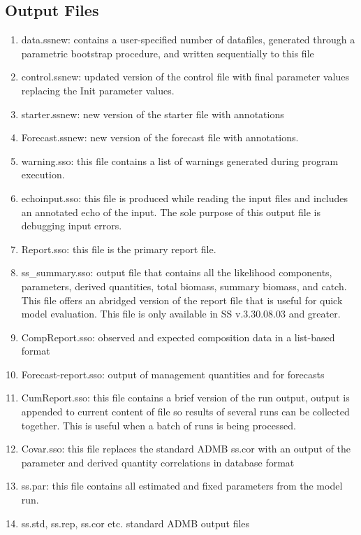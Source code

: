 	\subsection{Output Files}
	\begin{enumerate}
		\item data.ss\textunderscore new:  contains a user-specified number of datafiles, generated through a parametric bootstrap procedure, and written sequentially to this file
		\item control.ss\textunderscore new:  updated version of the control file with final parameter values replacing the Init parameter values.
		\item starter.ss\textunderscore new:  new version of the starter file with annotations
		\item Forecast.ss\textunderscore new:  new version of the forecast file with annotations.
		\item warning.sso:  this file contains a list of warnings generated during program execution.
		\item echoinput.sso:  this file is produced while reading the input files and includes an annotated echo of the input.  The sole purpose of this output file is debugging input errors.
		\item Report.sso:  this file is the primary report file.
		\item ss\_summary.sso: output file that contains all the likelihood components, parameters, derived quantities, total biomass, summary biomass, and catch. This file offers an abridged version of the report file that is useful for quick model evaluation. This file is only available in SS v.3.30.08.03 and greater.
		\item CompReport.sso:  observed and expected composition data in a list-based format
		\item Forecast-report.sso:  output of management quantities and for forecasts
		\item CumReport.sso:  this file contains a brief version of the run output, output is appended to current content of file so results of several runs can be collected together.  This is useful when a batch of runs is being processed.
		\item Covar.sso:  this file replaces the standard ADMB ss.cor with an output of the parameter and derived quantity correlations in database format
		\item ss.par: this file contains all estimated and fixed parameters from the model run. 
		\item ss.std, ss.rep, ss.cor etc.  standard ADMB output files

\end{enumerate}
